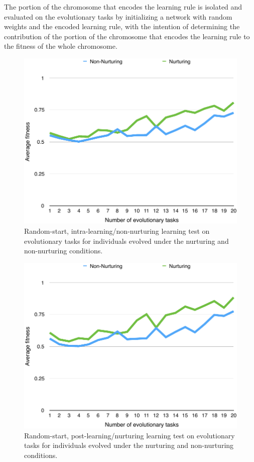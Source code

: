 \documentclass[master]{outhesis}
\begin{document}
The portion of the chromosome that encodes the learning rule is isolated and evaluated on the evolutionary tasks by initializing a network with random weights and the encoded learning rule, with the intention of determining the contribution of the portion of the chromosome that encodes the learning rule to the fitness of the whole chromosome.

\begin{figure}[H]
	\centering
	\includegraphics{NonNurturingLearningTestPlot.pdf}
	\caption{Random-start, intra-learning/non-nurturing learning test on evolutionary tasks for individuals evolved under the nurturing and non-nurturing conditions.}
\end{figure}

\begin{figure}[H]
	\centering
	\includegraphics{NurturingLearningTestPlot.pdf}
	\caption{Random-start, post-learning/nurturing learning test on evolutionary tasks for individuals evolved under the nurturing and non-nurturing conditions.}
\end{figure}
\end{document}

